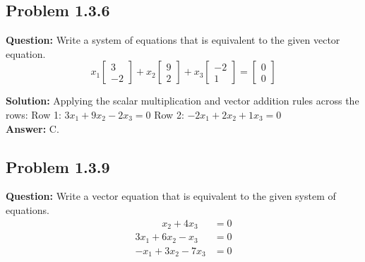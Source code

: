 \documentclass[11pt]{article}
\begin{document}
\subsection*{Problem 1.3.6}
\textbf{Question:} Write a system of equations that is equivalent to the given vector equation.
\[ x_1 \begin{bmatrix} 3 \\ -2 \end{bmatrix} + x_2 \begin{bmatrix} 9 \\ 2 \end{bmatrix} + x_3 \begin{bmatrix} -2 \\ 1 \end{bmatrix} = \begin{bmatrix} 0 \\ 0 \end{bmatrix} \]

\textbf{Solution:}
Applying the scalar multiplication and vector addition rules across the rows:
Row 1: $3x_1 + 9x_2 - 2x_3 = 0$
Row 2: $-2x_1 + 2x_2 + 1x_3 = 0$
\\
\textbf{Answer:} C.


\subsection*{Problem 1.3.9}
\textbf{Question:} Write a vector equation that is equivalent to the given system of equations.
\begin{align*}
    \phantom{3x_1 + } x_2 + 4x_3 &= 0 \\
    3x_1 + 6x_2 - x_3 &= 0 \\
    -x_1 + 3x_2 - 7x_3 &= 0
\end{align*}
\end{document}
